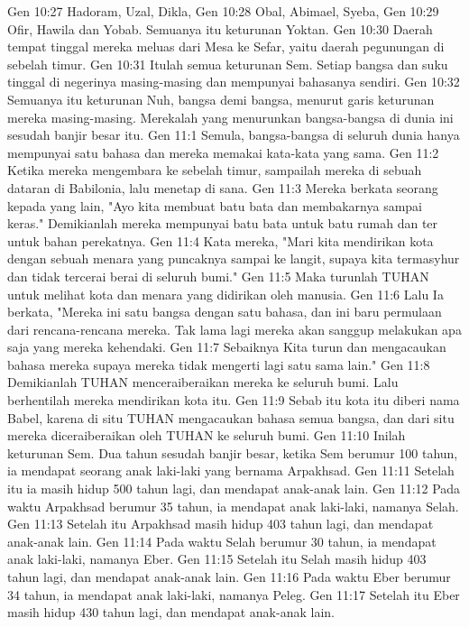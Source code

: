 Gen 10:27  Hadoram, Uzal, Dikla,
Gen 10:28  Obal, Abimael, Syeba,
Gen 10:29  Ofir, Hawila dan Yobab. Semuanya itu keturunan Yoktan.
Gen 10:30  Daerah tempat tinggal mereka meluas dari Mesa ke Sefar, yaitu daerah pegunungan di sebelah timur.
Gen 10:31  Itulah semua keturunan Sem. Setiap bangsa dan suku tinggal di negerinya masing-masing dan mempunyai bahasanya sendiri.
Gen 10:32  Semuanya itu keturunan Nuh, bangsa demi bangsa, menurut garis keturunan mereka masing-masing. Merekalah yang menurunkan bangsa-bangsa di dunia ini sesudah banjir besar itu.
Gen 11:1  Semula, bangsa-bangsa di seluruh dunia hanya mempunyai satu bahasa dan mereka memakai kata-kata yang sama.
Gen 11:2  Ketika mereka mengembara ke sebelah timur, sampailah mereka di sebuah dataran di Babilonia, lalu menetap di sana.
Gen 11:3  Mereka berkata seorang kepada yang lain, "Ayo kita membuat batu bata dan membakarnya sampai keras." Demikianlah mereka mempunyai batu bata untuk batu rumah dan ter untuk bahan perekatnya.
Gen 11:4  Kata mereka, "Mari kita mendirikan kota dengan sebuah menara yang puncaknya sampai ke langit, supaya kita termasyhur dan tidak tercerai berai di seluruh bumi."
Gen 11:5  Maka turunlah TUHAN untuk melihat kota dan menara yang didirikan oleh manusia.
Gen 11:6  Lalu Ia berkata, "Mereka ini satu bangsa dengan satu bahasa, dan ini baru permulaan dari rencana-rencana mereka. Tak lama lagi mereka akan sanggup melakukan apa saja yang mereka kehendaki.
Gen 11:7  Sebaiknya Kita turun dan mengacaukan bahasa mereka supaya mereka tidak mengerti lagi satu sama lain."
Gen 11:8  Demikianlah TUHAN menceraiberaikan mereka ke seluruh bumi. Lalu berhentilah mereka mendirikan kota itu.
Gen 11:9  Sebab itu kota itu diberi nama Babel, karena di situ TUHAN mengacaukan bahasa semua bangsa, dan dari situ mereka diceraiberaikan oleh TUHAN ke seluruh bumi.
Gen 11:10  Inilah keturunan Sem. Dua tahun sesudah banjir besar, ketika Sem berumur 100 tahun, ia mendapat seorang anak laki-laki yang bernama Arpakhsad.
Gen 11:11  Setelah itu ia masih hidup 500 tahun lagi, dan mendapat anak-anak lain.
Gen 11:12  Pada waktu Arpakhsad berumur 35 tahun, ia mendapat anak laki-laki, namanya Selah.
Gen 11:13  Setelah itu Arpakhsad masih hidup 403 tahun lagi, dan mendapat anak-anak lain.
Gen 11:14  Pada waktu Selah berumur 30 tahun, ia mendapat anak laki-laki, namanya Eber.
Gen 11:15  Setelah itu Selah masih hidup 403 tahun lagi, dan mendapat anak-anak lain.
Gen 11:16  Pada waktu Eber berumur 34 tahun, ia mendapat anak laki-laki, namanya Peleg.
Gen 11:17  Setelah itu Eber masih hidup 430 tahun lagi, dan mendapat anak-anak lain.
